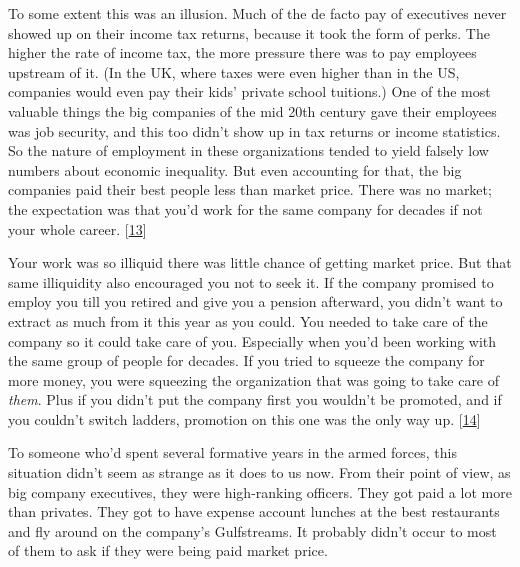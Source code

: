 To some extent this was an illusion. Much of the de facto pay of
executives never showed up on their income tax returns, because it took
the form of perks. The higher the rate of income tax, the more pressure
there was to pay employees upstream of it. (In the UK, where taxes were
even higher than in the US, companies would even pay their kids' private
school tuitions.) One of the most valuable things the big companies of
the mid 20th century gave their employees was job security, and this too
didn't show up in tax returns or income statistics. So the nature of
employment in these organizations tended to yield falsely low numbers
about economic inequality. But even accounting for that, the big
companies paid their best people less than market price. There was no
market; the expectation was that you'd work for the same company for
decades if not your whole career. {[}\hyperref[f13n]{13}{]}

Your work was so illiquid there was little chance of getting market
price. But that same illiquidity also encouraged you not to seek it. If
the company promised to employ you till you retired and give you a
pension afterward, you didn't want to extract as much from it this year
as you could. You needed to take care of the company so it could take
care of you. Especially when you'd been working with the same group of
people for decades. If you tried to squeeze the company for more money,
you were squeezing the organization that was going to take care of
\emph{them}. Plus if you didn't put the company first you wouldn't be
promoted, and if you couldn't switch ladders, promotion on this one was
the only way up. {[}\hyperref[f14n]{14}{]}

To someone who'd spent several formative years in the armed forces, this
situation didn't seem as strange as it does to us now. From their point
of view, as big company executives, they were high-ranking officers.
They got paid a lot more than privates. They got to have expense account
lunches at the best restaurants and fly around on the company's
Gulfstreams. It probably didn't occur to most of them to ask if they
were being paid market price.

